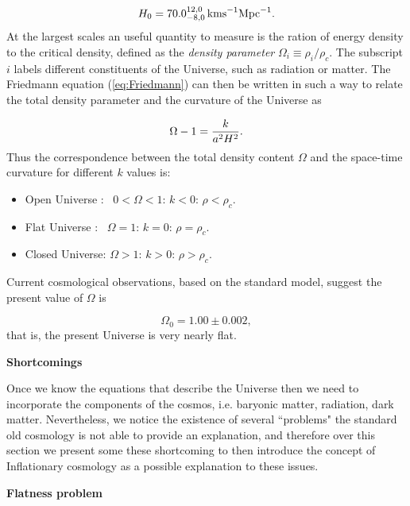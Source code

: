 \documentclass{rmaa}
\def\beq{\begin{equation}}
\def\eeq{\end{equation}}
\begin{document}
\beq
 H_0= 70.0^{12,0}_{-8,0} \, {\rm km s}^{-1} {\rm Mpc}^{-1}. 
\eeq
%
At the largest scales an useful quantity to measure is the ration of energy density to the critical density,
defined as the \textit{density parameter} $\Omega_i\equiv \rho_i / \rho_c$. The subscript $i$ labels
different constituents of the Universe, such as radiation or matter. 
The Friedmann equation (\ref{eq:Friedmann}) can then be written in such a way to
relate the total density parameter and the curvature of the Universe as

\begin{equation} \label{eq:curvature}
 \Omega -1={k \over a^2H^2}.
\end{equation}
%
Thus the correspondence between the total density content $\Omega$ and the space-time 
curvature for different $k$ values is: 
\begin{itemize}
\item Open Universe : ~$0<\Omega<1: \, k<0: \, \rho<\rho_c$. 
\item Flat Universe       :~ $\Omega=1: \, k=0: \, \rho=\rho_c$. 
\item Closed Universe: $\Omega>1: \, k>0: \, \rho>\rho_c$.
\end{itemize}

   
\noindent
Current cosmological observations, based on the standard model, suggest the present value of 
$\Omega$ is \citep{McCoy}

\beq \label{eq:Omega}
\Omega_0=1.00\pm 0.002,
\eeq
%
that is, the present Universe is very nearly flat.
\\


\begin{center}
\textbf{\large Shortcomings}
\end{center}
Once we know the equations that describe the Universe then we need to incorporate the
components of the cosmos, i.e. baryonic matter, radiation, dark matter. 
Nevertheless, we notice the existence of several ``problems" the standard old cosmology is not
able to provide an explanation, and therefore over this section we present some these shortcoming to 
then introduce the concept of Inflationary cosmology as a possible explanation to these issues. 
\vskip 10pt

\textbf{Flatness problem}
\vskip 10pt
\end{document}
